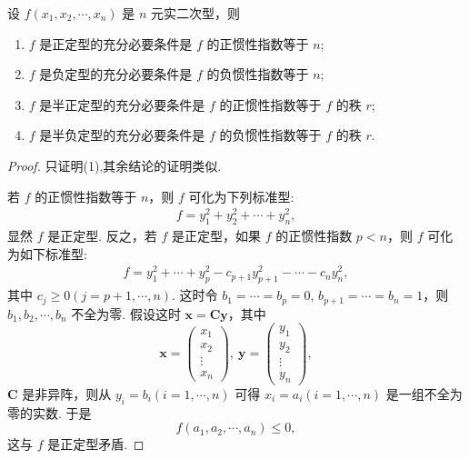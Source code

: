 \documentclass[../../main.tex]{subfiles}%
\begin{document}
\begin{theorem}\label{theorem:正定型的充要条件}
设 $f(x_1,x_2,\cdots,x_n)$ 是 $n$ 元实二次型，则 
\begin{enumerate}[(1)]
\item $f$ 是正定型的充分必要条件是 $f$ 的正惯性指数等于 $n$;

\item $f$ 是负定型的充分必要条件是 $f$ 的负惯性指数等于 $n$; 

\item $f$ 是半正定型的充分必要条件是 $f$ 的正惯性指数等于 $f$ 的秩 $r$; 

\item $f$ 是半负定型的充分必要条件是 $f$ 的负惯性指数等于 $f$ 的秩 $r$.
\end{enumerate}
\end{theorem}
\begin{proof}

只证明(1),其余结论的证明类似. 

若 $f$ 的正惯性指数等于 $n$，则 $f$ 可化为下列标准型:
\begin{align*}
f = y_1^2 + y_2^2 + \cdots + y_n^2,
\end{align*}
显然 $f$ 是正定型. 反之，若 $f$ 是正定型，如果 $f$ 的正惯性指数 $p < n$，则 $f$ 可化为如下标准型:
\begin{align}
f = y_1^2 + \cdots + y_p^2 - c_{p + 1}y_{p + 1}^2 - \cdots - c_ny_n^2,\label{eq:8.4.1}
\end{align}
其中 $c_j\geqslant  0 (j = p + 1,\cdots,n)$. 这时令 $b_1 = \cdots = b_p = 0$, $b_{p + 1} = \cdots = b_n = 1$，则 $b_1,b_2,\cdots,b_n$ 不全为零. 假设这时 $\boldsymbol{x}=\boldsymbol{C}\boldsymbol{y}$，其中
\[
\boldsymbol{x}=\begin{pmatrix}
x_1\\
x_2\\
\vdots\\
x_n
\end{pmatrix},\ \boldsymbol{y}=\begin{pmatrix}
y_1\\
y_2\\
\vdots\\
y_n
\end{pmatrix},
\]
$\boldsymbol{C}$ 是非异阵，则从 $y_i = b_i (i = 1,\cdots,n)$ 可得 $x_i = a_i (i = 1,\cdots,n)$ 是一组不全为零的实数. 于是
\[
f(a_1,a_2,\cdots,a_n)\leqslant  0,
\]
这与 $f$ 是正定型矛盾. 

\end{proof}
\end{document}
